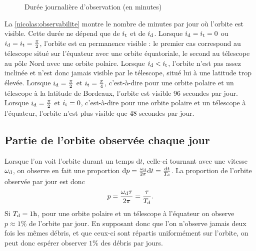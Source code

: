 \begin{figure}
\scriptsize
\begin{center}
\def\svgwidth{0.5\linewidth}
 
 \vspace*{-2em}
\caption{Durée journalière d'observation (en minutes)} \label{nicolas:observabilite}
\end{center}
\end{figure}%

La \autoref{nicolas:observabilite} montre le nombre de minutes par jour où l'orbite est visible. Cette durée ne dépend que de $i_\text{t}$ et de $i_\text{d}$. Lorsque $i_\text{d}=i_\text{t}=0$ ou $i_\text{d}=i_\text{t}=\frac{\pi}{2}$, l'orbite est en permanence visible : le premier cas correspond au télescope situé sur l'équateur avec une orbite équatoriale, le second au télescope au pôle Nord avec une orbite polaire. Lorsque $i_\text{d} < i_\text{t}$, l'orbite n'est pas assez inclinée et n'est donc jamais visible par le télescope, situé lui à une latitude trop élevée. Lorsque $i_\text{d} = \frac{\pi}{2}$ et $i_\text{t} = \frac{\pi}{4}$, c'est-à-dire pour une orbite polaire et un télescope à la latitude de Bordeaux, l'orbite est visible 96 secondes par jour. Lorsque $i_\text{d} = \frac{\pi}{2}$ et $i_\text{t} = 0$, c'est-à-dire pour une orbite polaire et un télescope à l'équateur, l'orbite n'est plus visible que 48 secondes par jour. 


\subsection{Partie de l'orbite observée chaque jour}

Lorsque l'on voit l'orbite durant un temps $\mathrm{d}t$, celle-ci tournant avec une vitesse $\omega_\text{d}$, on observe en fait une proportion $\mathrm{d}p = \frac{\omega_\text{d}}{2\pi} \mathrm{d} t = \frac{\mathrm{d}t}{T_\text{d}}$. La proportion de l'orbite observée par jour est donc
\[ p = \frac{\omega_\text{d} \tau}{2\pi} = \frac{\tau}{T_\text{d}}.\]
Si $T_\text{d} = 1 \text{h}$, pour une orbite polaire et un télescope à l'équateur on observe $p \approx 1 \%$ de l'orbite par jour. En supposant donc que l'on n'observe jamais deux fois les mêmes débris, et que ceux-ci sont répartis uniformément  sur l'orbite, on peut donc espérer observer $1 \%$ des débris par jours.


